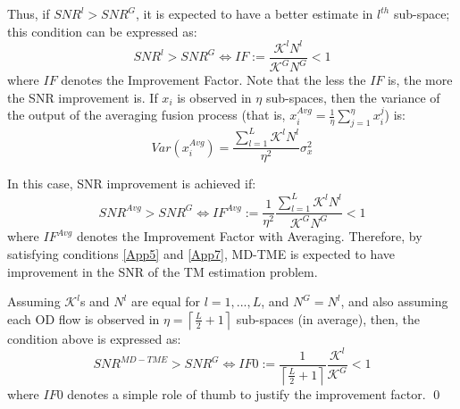 Thus, if $SNR^{l}>SNR^{G}$, it is expected to have a better estimate in $l^{th}$ sub-space; this condition can be expressed as:
\begin{equation}\label{App5}
SNR^{l}>SNR^{G} \Leftrightarrow IF:= \frac{\mathcal{K}^{l}N^{l}}{\mathcal{K}^{G}N^{G}}<1
\end{equation}
where $IF$ denotes the Improvement Factor. Note that the less the $IF$ is, the more the SNR improvement is. If $x_{i}$ is observed in $\eta$ sub-spaces, then the variance of the output of the averaging fusion process (that is, $x^{Avg}_{i}=\frac{1}{\eta} \sum_{j=1}^{\eta} x_{i}^{j}$) is:
\begin{equation}\label{App6}
Var\left(x^{Avg}_{i}\right) = \frac{\sum_{l=1}^{L} \mathcal{K}^{l}N^{l}}{\eta^{2}} \sigma^{2}_{x}
\end{equation}

In this case, SNR improvement is achieved if:
\begin{equation}\label{App7}
SNR^{Avg}>SNR^{G} \Leftrightarrow IF^{Avg}:= \frac{1}{\eta^{2}}\frac{\sum_{l=1}^{L} \mathcal{K}^{l}N^{l}}{\mathcal{K}^{G}N^{G}}<1
\end{equation}
where $IF^{Avg}$ denotes the Improvement Factor with Averaging. Therefore, by satisfying conditions \ref{App5} and \ref{App7}, MD-TME is expected to have improvement in the SNR of the TM estimation problem.

Assuming $\mathcal{K}^{l}$s and $N^{l}$ are equal for $l=1,...,L$, and $N^{G}=N^{l}$, and also assuming each OD flow is observed in $\eta=\left\lceil \frac{L}{2}+1\right\rceil$ sub-spaces (in average), then, the condition above is expressed as:
\begin{equation}\label{App8}
SNR^{MD-TME}>SNR^{G} \Leftrightarrow IF0:= \frac{1}{\left\lceil \frac{L}{2}+1\right\rceil}\frac{\mathcal{K}^{l}}{\mathcal{K}^{G}}<1
\end{equation}
where $IF0$ denotes a simple role of thumb to justify the improvement factor. \qed\\
